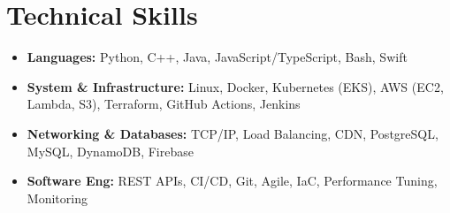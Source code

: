 \documentclass[a4paper, 10pt]{article}
\begin{document}
\section{Technical Skills}
\vspace{-5pt}
\begin{itemize}[itemsep=1pt, leftmargin=0in, label={}]
  \item \textbf{Languages:} Python, C++, Java, JavaScript/TypeScript, Bash, Swift
  \item \textbf{System \& Infrastructure:} Linux, Docker, Kubernetes (EKS), AWS (EC2, Lambda, S3), Terraform, GitHub Actions, Jenkins
  \item \textbf{Networking \& Databases:} TCP/IP, Load Balancing, CDN, PostgreSQL, MySQL, DynamoDB, Firebase
  \item \textbf{Software Eng:} REST APIs, CI/CD, Git, Agile, IaC, Performance Tuning, Monitoring
\end{itemize}
\end{document}

